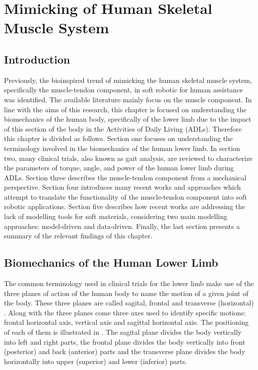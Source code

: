 \chapter{Mimicking of Human Skeletal Muscle System} \label{sec:mimicHSMS}

\section{Introduction}

Previously, the bioinspired trend of mimicking the human skeletal muscle system, specifically the muscle-tendon component, in soft robotic for human assistance was identified. The available literature mainly focus on the muscle component. In line with the aims of this research, this chapter is focused on understanding the biomechanics of the human body, specifically of the lower limb due to the impact of this section of the body in the Activities of Daily Living (ADLs). Therefore this chapter is divided as follows.
Section one focuses on understanding the terminology involved in the biomechanics of the human lower limb. In section two, many clinical trials, also known as gait analysis, are reviewed to characterize the parameters of torque, angle, and power of the human lower limb during ADLs. Section three describes the muscle-tendon component from a mechanical perspective. Section four introduces many recent works and approaches which attempt to translate the functionality of the muscle-tendon component into soft robotic applications. Section five describes how recent works are addressing the lack of modelling tools for soft materials, considering two main modelling approaches: model-driven and data-driven. Finally, the last section presents a summary of the relevant findings of this chapter.

\section{Biomechanics of the Human Lower Limb}

The common terminology used in clinical trials for the lower limb make use of the three planes of action of the human body to name the motion of a given joint of the body. These three planes are called sagital, frontal and transverse (horizontal) \cite{PhysicalSolutions2016}. Along with the three planes come three axes used to identify specific motions: frontal horizontal axis, vertical axis and sagittal horizontal axis. The positioning of each of them is illustrated in . The sagital plane divides the body vertically into left and right parts, the frontal plane divides the body vertically into front (posterior) and back (anterior) parts and the transverse plane divides the body horizontally into upper (superior) and lower (inferior) parts.

